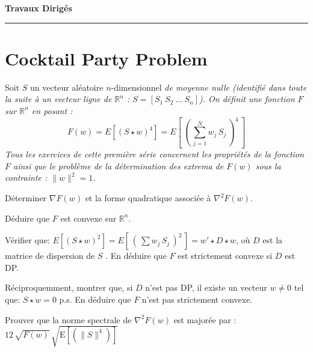 \documentclass[12pt,a4paper,fleqn]{report}
\makeatletter
\def\cleardoublepage{\clearpage\if@twoside\ifodd\c@page\else\hbox{}\thispagestyle{empty}\newpage\fi\fi}
\newcommand{\R}{\mathbb R}
\newcommand{\grad}{\nabla}
\newcommand{\hess}{\nabla^2}
\newcommand{\on}{\begin{displaymath}}
\newcommand{\off}{\end{displaymath}}
\makeatother
\begin{document}
\cleardoublepage



\begin{center}

\textbf{\huge Travaux Dirig\'es }

\smallskip

\rule{10cm}{0.4pt}

\end{center}


\section{Cocktail Party Problem}

Soit $S$ un vecteur aléatoire $n$-dimensionnel  \it de moyenne nulle \rm (identifié dans toute la suite à un vecteur ligne de $\R^n$ : $S=[S_1\ S_2\ \ldots\ S_n]$).
On définit une fonction $F$ sur $\R^n$ en posant : 
\on F(w)=E[(S\star w)^4]=E\left[\,\left( \,\sum_{j=1}^N w_j\,S_j\,\right)^4\,\right] \off
Tous les exercices de cette première série concernent les propriétés de  la fonction $F$ ainsi que le problème de la détermination des extrema de $F(w)$ sous la contrainte : $\|w\|^2=1$. 

\begin{exercice}
\rien
\begin{questions}
\item Déterminer  $ \grad F(w)$ et  la forme quadratique associée à $\hess F(w)$.
\item Déduire que $F$ est convexe sur $\R^n$.
\item Vérifier que: 
\mbox{$ E[(S\star w)^2]=E\left[\,\left( \,\sum w_j\,S_j\,\right)^2\,\right] =w'\star D\star w $}, 
où $D$ est la matrice de dispersion de $S$ . En déduire que $F$ est strictement convexe si  $D$ est DP.
\item Réciproquemment, montrer que, si $D$ n'est pas DP, il existe un vecteur $w\neq 0$ tel que: $S\star w=0$ p.s. En déduire que $F$ n'est pas strictement convexe.  
\item Prouver que la norme spectrale de $\hess F(w)$  est majorée par :  $12\,\sqrt{F(w)}\,\sqrt{ \mbox{E} [(\| S\|^4)]}$\end{questions}
\end{exercice}
\end{document}
